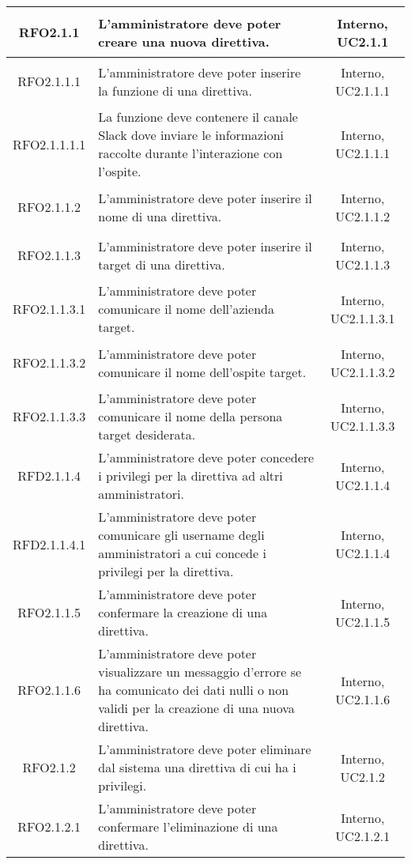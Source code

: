 \begin{longtable}{|c|>{\centering}m{7cm}|c|}
\hypertarget{RFO2.1.1}{RFO2.1.1} & L'amministratore deve poter creare una nuova direttiva. & Interno, UC2.1.1\\ \hline
\hypertarget{RFO2.1.1.1}{RFO2.1.1.1} & L'amministratore deve poter inserire la funzione di una direttiva. & Interno, UC2.1.1.1\\ \hline
\hypertarget{RFO2.1.1.1.1}{RFO2.1.1.1.1} & La funzione deve contenere il canale Slack dove inviare le informazioni raccolte durante l'interazione con l'ospite. & Interno, UC2.1.1.1\\ \hline
\hypertarget{RFO2.1.1.2}{RFO2.1.1.2} & L'amministratore deve poter inserire il nome di una direttiva. & Interno, UC2.1.1.2\\ \hline
\hypertarget{RFO2.1.1.3}{RFO2.1.1.3} & L'amministratore deve poter inserire il target di una direttiva. & Interno, UC2.1.1.3\\ \hline
\hypertarget{RFO2.1.1.3.1}{RFO2.1.1.3.1} & L'amministratore deve poter comunicare il nome dell'azienda target. & Interno, UC2.1.1.3.1\\ \hline
\hypertarget{RFO2.1.1.3.2}{RFO2.1.1.3.2} & L'amministratore deve poter comunicare il nome dell'ospite target. & Interno, UC2.1.1.3.2\\ \hline
\hypertarget{RFO2.1.1.3.3}{RFO2.1.1.3.3} & L'amministratore deve poter comunicare il nome della persona target desiderata. & Interno, UC2.1.1.3.3\\ \hline
\hypertarget{RFD2.1.1.4}{RFD2.1.1.4} & L'amministratore deve poter concedere i privilegi per la direttiva ad altri amministratori. & Interno, UC2.1.1.4\\ \hline
\hypertarget{RFD2.1.1.4.1}{RFD2.1.1.4.1} & L'amministratore deve poter comunicare gli username degli amministratori a cui concede i privilegi per la direttiva. & Interno, UC2.1.1.4\\ \hline
\hypertarget{RFO2.1.1.5}{RFO2.1.1.5} & L'amministratore deve poter confermare la creazione di una direttiva. & Interno, UC2.1.1.5\\ \hline
\hypertarget{RFO2.1.1.6}{RFO2.1.1.6} & L'amministratore deve poter visualizzare un messaggio d'errore se ha comunicato dei dati nulli o non validi per la creazione di una nuova direttiva. & Interno, UC2.1.1.6\\ \hline
\hypertarget{RFO2.1.2}{RFO2.1.2} & L'amministratore deve poter eliminare dal sistema una direttiva di cui ha i privilegi. & Interno, UC2.1.2\\ \hline
\hypertarget{RFO2.1.2.1}{RFO2.1.2.1} & L'amministratore deve poter confermare l'eliminazione di una direttiva. & Interno, UC2.1.2.1\\ \hline

\end{longtable}
